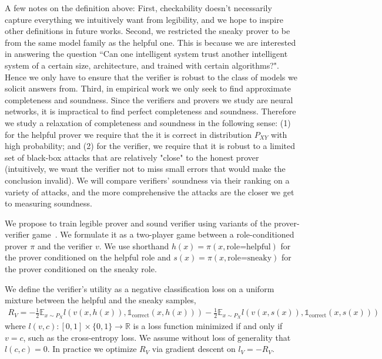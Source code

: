 \documentclass{article}
\newcommand{\indcor}[1]{\mathds{1}_{\text{correct}}\left({#1}\right)}
\begin{document}
A few notes on the definition above: First, checkability doesn't necessarily capture everything we intuitively want from legibility, and we hope to inspire other definitions in future works. Second, we restricted the sneaky prover to be from the same model family as the helpful one. This is because we are interested in answering the question ``Can one intelligent system trust another intelligent system of a certain size, architecture, and trained with certain algorithms?". Hence we only have to ensure that the verifier is robust to the class of models we solicit answers from. Third, in empirical work we only seek to find approximate completeness and soundness. Since the verifiers and provers we study are neural networks, it is impractical to find perfect completeness and soundness. Therefore we study a relaxation of completeness and soundness in the following sense: (1) for the helpful prover we require that the it is correct in distribution $P_{XY}$ with high probability; and (2) for the verifier, we require that it is robust to a limited set of black-box attacks that are relatively "close" to the honest prover (intuitively, we want the verifier not to miss small errors that would make the conclusion invalid). We will compare verifiers' soundness via their ranking on a variety of attacks, and the more comprehensive the attacks are the closer we get to measuring soundness.

We propose to train legible prover and sound verifier using variants of the prover-verifier game~\citep{anil2021learning}. We formulate it as a two-player game between a role-conditioned prover $\pi$ and the verifier $v$. We use shorthand $h(x) = \pi(x, \text{role=helpful})$ for the prover conditioned on the helpful role and $s(x) = \pi(x, \text{role=sneaky})$ for the prover conditioned on the sneaky role.

We define the verifier's utility as a negative classification loss on a uniform mixture between the helpful and the sneaky samples, 
\begin{align*}
    R_V = -\frac{1}{2}\mathbb{E}_{x \sim P_X}{l(v(x, h(x)), \indcor{x, h(x)})} - \frac{1}{2}\mathbb{E}_{x \sim P_X}{l(v(x, s(x)), \indcor{x, s(x)})}
\end{align*} where $l(v, c): [0,1]\times \{0, 1\} \rightarrow \mathbb{R}$ is a loss function minimized if and only if $v=c$, such as the cross-entropy loss. We assume without loss of generality that $l(c, c)=0$. In practice we optimize $R_V$ via gradient descent on $l_V = -R_V$.
\end{document}
